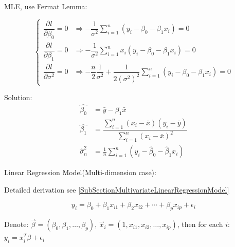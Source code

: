 \begin{enumerate}
    MLE, use Fermat Lemma:

\begin{equation}
    \begin{cases}
        \dfrac{\partial^{} l}{\partial \beta _0^{}}=0&\Rightarrow -\dfrac{1}{\sigma ^2}{\displaystyle\sum_{i=1}^n(y_i-\beta _0-\beta _1x_i)}=0\\
        \dfrac{\partial^{} l}{\partial \beta _1^{}}=0&\Rightarrow -\dfrac{1}{\sigma ^2}{\displaystyle\sum_{i=1}^nx_i(y_i-\beta _0-\beta _1x_i)}=0\\
        \dfrac{\partial^{} l}{\partial \sigma^2}=0&\Rightarrow -\dfrac{n}{2}\dfrac{1}{\sigma ^2}+\dfrac{1}{2(\sigma ^2)^2} {\displaystyle\sum_{i=1}^n(y_i-\beta _0-\beta _1x_i)}=0
    \end{cases} 
\end{equation}

    Solution:
    \begin{align*}
        \hat{\beta_0}&=\bar{y}-\beta_1\bar{x}\\
        \hat{\beta_1}&=\dfrac{\sum_{i=1}^n(x_i-\bar{x})(y_i-\bar{y})}{\sum_{i=1}^n(x_i-\bar{x})^2}\\
        \hat{\sigma}^2_n&=\frac{1}{n}\sum_{i=1}^n(y_i-\hat{\beta}_0-\hat{\beta}_1x_i)
    \end{align*}
    
    
    \end{enumerate}

\begin{point}
    Linear Regression Model(Multi-dimension case):
\end{point}

    Detailed derivation see \autoref{SubSectionMultivariateLinearRegressionModel}
    
\begin{equation}
    y_i=\beta_0+\beta_1x_{i1}+\beta_2x_{i2}+\cdots+\beta_px_{ip}+\epsilon_i    
\end{equation}

    Denote: $\vec{\beta}=(\beta_0,\beta_1,\ldots,\beta_p),\, \vec{x}_i=(1,x_{i1},x_{i2},\ldots,x_{ip})$, then for each $i$: $y_i=x_i^T\beta+\epsilon_i$

